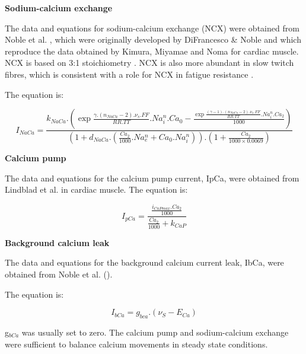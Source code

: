 \documentclass[fleqn,10pt]{physiome}
\begin{document}
\textbf{Sodium-calcium exchange}\newline

The data and equations for sodium-calcium exchange (NCX) were obtained from Noble et al. \citep{noble1991role}, which were originally developed by DiFrancesco & Noble \citep{di1985model} and which reproduce the data obtained by Kimura, Miyamae and Noma \citep{kimura1987identification} for cardiac muscle. NCX is based on 3:1 stoichiometry \citep{michel2014function}. NCX is also more abundant in slow twitch fibres, which is consistent with a role for NCX in fatigue resistance \citep{michel2014function}.\newline

The equation is:\newline

\begin{equation}
    I_{NaCa} = \frac{k_{NaCa}.(\exp{\frac{\gamma.(n_{NaCa}-2).\nu_{s}.FF}{RR.TT}}.Na_i^{n}.Ca_{0}-\frac{\exp{\frac{(\gamma-1).(n_{NaCa}-2).\nu_{s}.FF}{RR.TT}}.Na_i^{n}.Ca_{2}}{1000})}{(1+d_{NaCa}.(\frac{Ca_2}{1000}.Na_e^n+Ca_0.Na_i^n)).(1+\frac{Ca_2}{1000\times0.0069})}
\end{equation}

\textbf{Calcium pump}\newline

The data and equations for the calcium pump current, IpCa, were obtained from
Lindblad et al. \citep{lindblad1996model} in cardiac muscle.\newline
The equation is:\newline

\begin{equation}
    I_{pCa} = \frac{\frac{i_{CaPmax}.Ca_2}{1000}}{\frac{Ca_2}{1000}+k_{CaP}}
\end{equation}

\textbf{Background calcium leak}\newline

The data and equations for the background calcium current leak, IbCa, were obtained from Noble et al. (\citep{noble1991role}).\newline

The equation is: \newline

\begin{equation}
    I_{bCa} = g_{bca}.(\nu_S - E_{Ca})
\end{equation}

g$_{bCa}$ was usually set to zero. The calcium pump and sodium-calcium exchange were sufficient to balance calcium movements in steady state conditions. 
\end{document}
